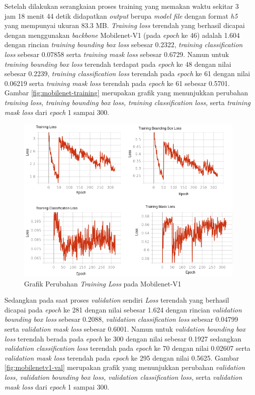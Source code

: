 Setelah dilakukan serangkaian proses training yang memakan waktu sekitar 3 jam 18 menit 44 detik didapatkan \textit{output} berupa \textit{model file}  dengan format \textit{h5} yang mempunyai ukuran 83.3 MB. \textit{Training loss} terendah yang berhasil dicapai dengan menggunakan \textit{backbone} Mobilenet-V1 (pada \textit{epoch} ke 46) adalah 1.604 dengan rincian \textit{training bounding box loss} sebesar 0.2322, \textit{training classification loss} sebesar 0.07858 serta \textit{training mask loss} sebesar 0.6729. Namun untuk \textit{training bounding box loss} terendah terdapat pada \textit{epoch} ke 48 dengan nilai sebesar 0.2239, \textit{training classification loss} terendah pada \textit{epoch} ke 61 dengan nilai 0.06219 serta \textit{training mask loss} terendah pada \textit{epoch} ke 61 sebesar 0.5701. Gambar \ref{fig:mobilenet-training} merupakan grafik yang menunjukkan perubahan \textit{training loss, training bounding box loss, training classification loss,} serta \textit{training mask loss} dari \textit{epoch} 1 sampai 300. 

\begin{figure}[h]
	\centering
	\includegraphics[scale=0.36]{gambar/mobilenetv1-train.png}
	\caption{Grafik Perubahan \textit{Training Loss} pada Mobilenet-V1}
	\label{fig:mobilenetv1-training}
\end{figure}


Sedangkan pada saat proses \textit{validation} sendiri \textit{Loss} terendah yang berhasil dicapai pada \textit{epoch} ke 281 dengan nilai sebesar 1.624 dengan rincian \textit{validation bounding box loss} sebesar 0.2088, \textit{validation classification loss} sebesar 0.04799 serta \textit{validation mask loss} sebesar 0.6001. Namun untuk \textit{validation bounding box loss} terendah berada pada \textit{epoch} ke 300 dengan nilai sebesar 0.1927 sedangkan \textit{validation classification loss} terendah pada \textit{epoch} ke 70 dengan nilai 0.02607 serta \textit{validation mask loss} terendah pada \textit{epoch} ke 295 dengan nilai 0.5625. Gambar \ref{fig:mobilenetv1-val} merupakan grafik yang menunjukkan perubahan \textit{validation loss, validation bounding box loss, validation classification loss,} serta \textit{validation mask loss} dari \textit{epoch} 1 sampai 300.

